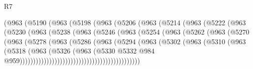 \begin{lexlean}{R7}
\begin{coremodule}
                  (@963
                    (@5190
                      (@963
                        (@5198
                          (@963
                            (@5206
                              (@963
                                (@5214
                                  (@963
                                    (@5222
                                      (@963
                                        (@5230
                                          (@963
                                            (@5238
                                              (@963
                                                (@5246
                                                  (@963
                                                    (@5254
                                                      (@963
                                                        (@5262
                                                          (@963
                                                            (@5270
                                                              (@963
                                                                (@5278
                                                                  (@963
                                                                    (@5286
                                                                      (@963
                                                                        (@5294
                                                                          (@963
                                                                            (@5302
                                                                              (@963
                                                                                (@5310
                                                                                  (@963
                                                                                    (@5318
                                                                                      (@963
                                                                                        (@5326
                                                                                          (@963
                                                                                            (@5330
                                                                                              @5332
                                                                                              @984
                                                                                              @959)))))))))))))))))))))))))))))))))))))))))))))

\end{coremodule}
\end{lexlean}
